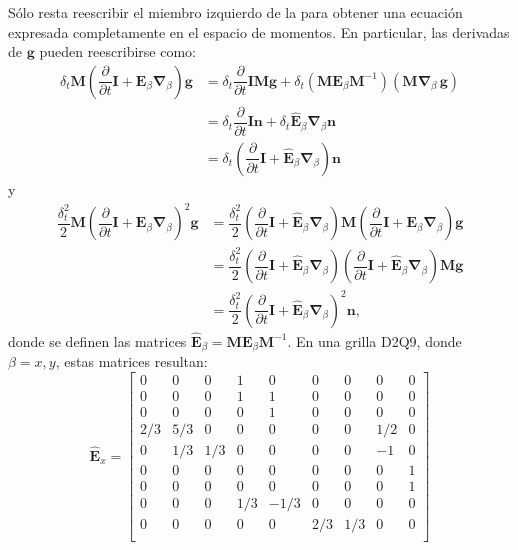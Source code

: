 S\'olo resta reescribir el miembro izquierdo de la  para obtener una ecuaci\'on expresada completamente en el espacio de momentos. En particular, las derivadas de $\bm{g}$ pueden reescribirse como:
\begin{equation}
	\begin{aligned}
		\delta_t \bm{M}\left( \dfrac{\partial}{\partial t} \bm{I} + \bm{E}_{\beta}\bm{\nabla}_{\beta} \right) \bm{g} &= \delta_t \dfrac{\partial}{\partial t}\bm{IMg} + \delta_t ( \bm{M} \bm{E}_{\beta} \bm{M}^{-1} )( \bm{M} \bm{\nabla}_{\beta} \, \bm{g}) \\
		&= \delta_t \dfrac{\partial}{\partial t}\bm{In} + \delta_t \hat{\bm{E}}_{\beta} \bm{\nabla}_{\beta} \bm{n} \\
		&= \delta_t\left( \dfrac{\partial}{\partial t}\bm{I} + \hat{\bm{E}}_{\beta} \bm{\nabla}_{\beta} \right) \bm{n}
	\end{aligned}
	\label{eq:M_propag_1}
\end{equation}
y
\begin{equation}
	\begin{aligned}
		\dfrac{\delta^2_t}{2} \bm{M}\left( \dfrac{\partial}{\partial t} \bm{I} + \bm{E}_{\beta}\bm{\nabla}_{\beta} \right)^2 \bm{g} 
		&= \dfrac{\delta^2_t}{2} \left( \dfrac{\partial}{\partial t}\bm{I} + \hat{\bm{E}}_{\beta} \bm{\nabla}_{\beta} \right) \bm{M} \left( \dfrac{\partial}{\partial t}\bm{I} + \bm{E}_{\beta} \bm{\nabla}_{\beta} \right) \bm{g} \\
		&= \dfrac{\delta^2_t}{2} \left( \dfrac{\partial}{\partial t}\bm{I} + \hat{\bm{E}}_{\beta} \bm{\nabla}_{\beta} \right) \left( \dfrac{\partial}{\partial t}\bm{I} + \hat{\bm{E}}_{\beta} \bm{\nabla}_{\beta} \right) \bm{Mg} \\
		&= \dfrac{\delta^2_t}{2} \left( \dfrac{\partial}{\partial t}\bm{I} + \hat{\bm{E}}_{\beta} \bm{\nabla}_{\beta} \right)^2 \bm{n},
	\end{aligned}
	\label{eq:M_propag_2}
\end{equation}
donde se definen las matrices $\hat{\bm{E}}_{\beta} = \bm{M} \bm{E}_{\beta} \bm{M}^{-1}$. En una grilla D2Q9, donde $\beta=x,y$, estas matrices resultan:
\begin{equation}
	\hat{\bm{E}}_{x}=
	\begin{bmatrix}
	0 & 0 & 0 & 1 & 0 & 0 & 0 & 0 & 0 \\
	0 & 0 & 0 & 1 & 1 & 0 & 0 & 0 & 0 \\
	0 & 0 & 0 & 0 & 1 & 0 & 0 & 0 & 0 \\
	2/3 & 5/3 & 0 & 0 & 0 & 0 & 0 & 1/2 & 0 \\
	0 & 1/3 & 1/3 & 0 & 0 & 0 & 0 & -1 & 0 \\
	0 & 0 & 0 & 0 & 0 & 0 & 0 & 0 & 1 \\
	0 & 0 & 0 & 0 & 0 & 0 & 0 & 0 & 1 \\
	0 & 0 & 0 & 1/3 & -1/3 & 0 & 0 & 0 & 0 \\
	0 & 0 & 0 & 0 & 0 & 2/3 & 1/3 & 0 & 0 \\
	\end{bmatrix}
\end{equation} 

